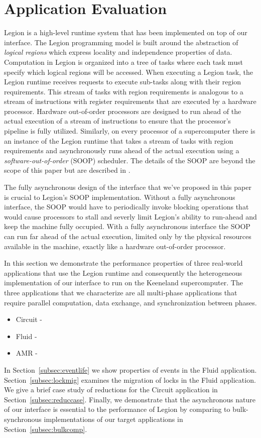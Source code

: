
\section{Application Evaluation}
\label{sec:apps}
Legion is a high-level runtime system that has been implemented on top
of our interface\cite{Legion12}.  
The Legion programming model is built around the abstraction of 
{\em logical regions} which express locality and independence properties 
of data.  Computation in Legion is organized into a tree of tasks where 
each task must specify which logical regions will be accessed.
When executing a Legion task, the Legion runtime receives requests
to execute sub-tasks along with their region requirements.
This stream of tasks with region requirements is analogous to a stream
of instructions with register requirements that are executed by 
a hardware processor.  Hardware out-of-order processors are designed to
run ahead of the actual execution of a stream of instructions
to ensure that the processor's pipeline is fully utilized.  Similarly, on
every processor of a supercomputer there is an instance of the Legion runtime
that takes a stream of tasks with region requirements and asynchronously
runs ahead of the actual execution using a {\em software-out-of-order} (SOOP)
scheduler.  The details of the SOOP are beyond the scope of this paper
but are described in \cite{Legion12}.

The fully asynchronous design of the interface that we've proposed in
this paper is crucial to Legion's SOOP implementation.  Without a fully
asynchronous interface, the SOOP would have to periodically invoke
blocking operations that would cause processors to stall and severly
limit Legion's ability to run-ahead and keep the machine fully
occupied.  With a fully asynchronous interface the SOOP can run
far ahead of the actual execution, limited only by the physical resources
available in the machine, exactly like a hardware out-of-order processor.

In this section we demonstrate the performance properties of three
real-world applications that use the Legion runtime and consequently the heterogeneous
implementation of our interface to run on the Keeneland supercomputer.
The three applications that we characterize are all multi-phase
applications that require parallel computation, data exchange, and
synchronization between phases. 
\begin{itemize} \itemsep1pt \parskip0pt 
\item Circuit - 
\item Fluid -
\item AMR - 
\end{itemize}
In Section~\ref{subsec:eventlife} we show properties of events in
the Fluid application.  Section~\ref{subsec:lockmig} examines
the migration of locks in the Fluid application.  We give
a brief case study of reductions for the Circuit application
in Section~\ref{subsec:reduccase}.  Finally, we demonstrate
that the asynchronous nature of our interface is essential to the
performance of Legion by comparing to bulk-synchronous
implementations of our target applications in Section~\ref{subsec:bulkcomp}.
  

